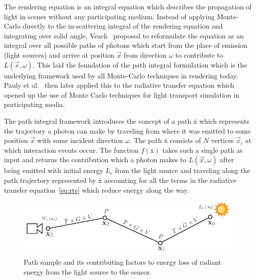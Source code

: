 The rendering equation is an integral equation which describes the propagation of light in scenes without any participating medium. Instead of applying Monte-Carlo directly to the in-scattering integral of the rendering equation and integrating over solid angle, Veach~\cite{VeachThesis97} proposed to reformulate the equation as an integral over all possible paths of photons which start from the place of emission (light sources) and arrive at position $\vec{x}$ from direction $\omega$ to contribute to $L(\vec{x}, \omega)$. This laid the foundation of the path integral formulation which is the underlying framework used by all Monte-Carlo techniques in rendering today. Pauly et al.~\cite{Pauly00} then later applied this to the radiative transfer equation which opened up the use of Monte Carlo techniques for light transport simulation in participating media.


The path integral framework introduces the concept of a path $\bar{\mathrm{x}}$ which represents the trajectory a photon can make by traveling from where it was emitted to some position $\vec{x}$ with some incident direction $\omega$. The path $\bar{\mathrm{x}}$ consists of $N$ vertices $\vec{x}_i$ at which interaction events occur. The function $f\left(\bar{\mathrm{x}}\right)$ takes such a single path as input and returns the contribution which a photon makes to $L(\vec{x}, \omega)$ after being emitted with initial energy $L_e$ from the light source and traveling along the path trajectory represented by $\bar{\mathrm{x}}$ accounting for all the terms in the radiative transfer equation~\ref{eq:rte} which reduce energy along the way.
\begin{figure}[t]
\centering
\includegraphics[width=1.0\textwidth]{03_foundations_of_light_transport_simulation/figures/fig_path_sample.pdf}
\caption{Path sample and its contributing factors to energy loss of radiant energy from the light source to the sensor.}
\label{fig:mc_path_sample_contributions}
\end{figure}

